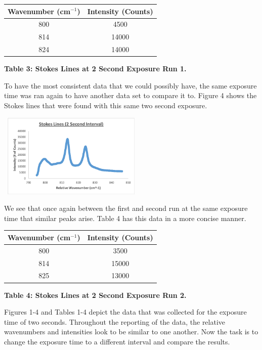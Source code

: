 \documentclass[]{article}
\begin{document}
\begin{multicols}{2}
\newline
\begin{tabular}{|c|c|}
    \hline \textbf{Wavenumber (cm$^{-1}$)} & \textbf{Intensity (Counts)} \\ \hline
    800 & 4500 \\ \hline
    814 & 14000 \\ \hline
    824 & 14000 \\ \hline
\end{tabular}
\centerline{\tiny\textbf{{Table 3: Stokes Lines at 2 Second Exposure Run 1.}}}
\newline
To have the most consistent data that we could possibly have, the same exposure time was ran again to have another data set to compare it to. Figure 4 shows the Stokes lines that were found with this same two second exposure.
\begin{center}
    \includegraphics[width=7cm, height=4cm]{PHYS 331 RS (2 Sec) 2b.png}
    \caption{\textbf{\small{Figure 4:} Stokes Lines at 2 Second Exposure Run 2}}
\end{center}
We see that once again between the first and second run at the same exposure time that similar peaks arise. Table 4 has this data in a more concise manner.
\newline
\begin{tabular}{|c|c|}
    \hline \textbf{Wavenumber (cm$^{-1}$)} & \textbf{Intensity (Counts)} \\ \hline
    800 & 3500 \\ \hline
    814 & 15000 \\ \hline
    825 & 13000 \\ \hline
\end{tabular}
\centerline{\tiny\textbf{{Table 4: Stokes Lines at 2 Second Exposure Run 2.}}}
\newline
Figures 1-4 and Tables 1-4 depict the data that was collected for the exposure time of two seconds. Throughout the reporting of the data, the relative wavenumbers and intensities look to be similar to one another. Now the task is to change the exposure time to a different interval and compare the results.

\end{multicols}
\end{document}
